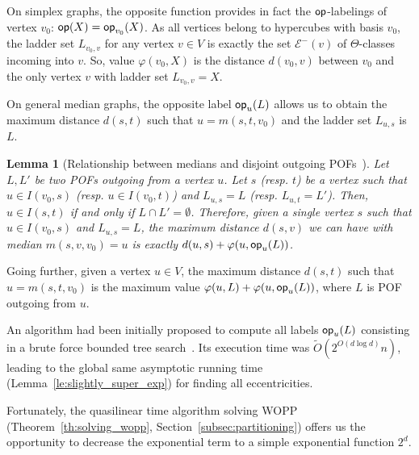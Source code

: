 \documentclass{article}
\newtheorem{lemma}{Lemma}
\newcommand{\opp}{\mbox{\textsf{op}}}
\begin{document}
On simplex graphs, the opposite function provides in fact the $\opp$-labelings of vertex $v_0$: $\opp(X) = \opp_{v_0}(X)$. As all vertices belong to hypercubes with basis $v_0$, the ladder set $L_{v_0,v}$ for any vertex $v\in V$ is exactly the set $\mathcal{E}^-(v)$ of $\Theta$-classes incoming into $v$. So, value $\varphi(v_0,X)$ is the distance $d(v_0,v)$ between $v_0$ and the only vertex $v$ with ladder set $L_{v_0,v} = X$.

On general median graphs, the opposite label $\opp_u(L)$ allows us to obtain the maximum distance $d(s,t)$ such that $u = m(s,t,v_0)$ and the ladder set $L_{u,s}$ is $L$.

\begin{lemma}[Relationship between medians and disjoint outgoing POFs~\cite{BeHa21}]
Let $L,L'$ be two POFs outgoing from a vertex $u$. Let $s$ (resp. $t$) be a vertex such that $u \in I(v_0,s)$ (resp. $u \in I(v_0,t)$) and $L_{u,s} = L$ (resp. $L_{u,t} = L'$). Then, $u \in I(s,t)$ if and only if $L \cap L' = \emptyset$. Therefore, given a single vertex $s$ such that $u \in I(v_0,s)$ and $L_{u,s} = L$, the maximum distance $d(s,v)$ we can have with median $m(s,v,v_0) = u$ is exactly $d(u,s)+\varphi(u,\opp_u(L))$.
\label{le:property_opp}
\end{lemma}

Going further, given a vertex $u \in V$, the maximum distance $d(s,t)$ such that $u = m(s,t,v_0)$ is the maximum value $\varphi(u,L) + \varphi(u,\opp_u(L))$, where $L$ is POF outgoing from $u$.

An algorithm had been initially proposed to compute all labels $\opp_u(L)$ consisting in a brute force bounded tree search~\cite{BeHa21}. Its execution time was $\tilde{O}(2^{O(d\log d)}n)$, leading to the global same asymptotic running time (Lemma~\ref{le:slightly_super_exp}) for finding all eccentricities.

Fortunately, the quasilinear time algorithm solving WOPP (Theorem~\ref{th:solving_wopp}, Section~\ref{subsec:partitioning}) offers us the opportunity to decrease the exponential term to a simple exponential function $2^d$.
\end{document}

